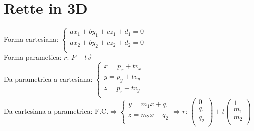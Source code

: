 \section{Rette in 3D}

Forma cartesiana: $\begin{cases}
	ax_1 + by_1 + cz_1 + d_1 = 0 \\
	ax_2 + by_2 + cz_2 + d_2 = 0 \\
\end{cases}$ \\
Forma parametica: $r \text{: } P+t\overrightarrow{v}$ \\

Da parametrica a cartesiana:
$\begin{cases}
	x = p_x + t v_x \\
	y = p_y + t v_y \\
	z = p_z + t v_y \\
\end{cases}$ \\

Da cartesiana a parametrica:
$\text{F.C.} \Longrightarrow \begin{cases}
	y = m_1 x + q_1 \\
	z = m_2 x + q_2 \\
\end{cases}
\Longrightarrow r \text{: } \begin{pmatrix}
	0 \\
	q_1 \\
	q_2 \\
\end{pmatrix}
+ t \begin{pmatrix}
	1 \\
	m_1 \\
	m_2 \\
\end{pmatrix}$ \\